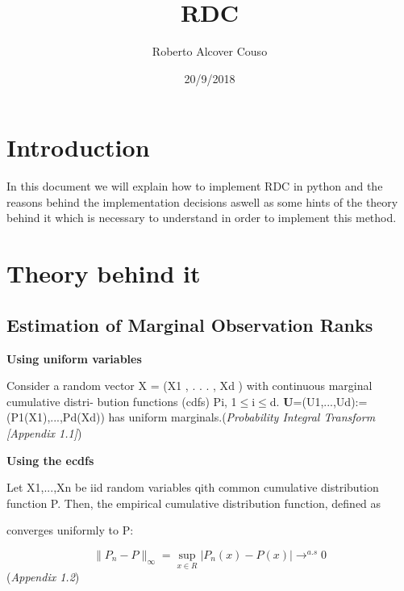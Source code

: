 \documentclass[11pt,twoside,a4paper]{article}
\begin{document}
\title{RDC}
\author{Roberto Alcover Couso}
\date{20/9/2018}
\maketitle

\section*{Introduction}
In this document we will explain how to implement RDC in python and the reasons behind the implementation decisions aswell as some hints of the theory behind it which is necessary to understand in order to implement this method.
\section*{Theory behind it}
\subsection*{Estimation of Marginal Observation Ranks}
\textbf{Using uniform variables}

Consider a random vector X = (X\small{1} , . . . , X\small{d} ) with continuous marginal cumulative distri-
bution functions (cdfs) P\small{i}, 1$\leq$i$\leq$d. 
\textbf{U}=(U\small{1},...,U\small{d}):=(P\small{1}(X\small{1}),...,P\small{d}(X\small{d})) has uniform marginals.(\textit{Probability Integral Transform [Appendix 1.1]})

\begin{flushleft}
\textbf{Using the ecdfs}

Let X\small{1},...,X\small{n} be iid random variables qith common cumulative distribution function P. Then, the empirical cumulative distribution function, defined as
\end{flushleft}
\begin{flushleft}
converges uniformly to P:
\end{flushleft}
$$\|P_{n} - P\|_{\infty}= \sup_{x \in R}|P_{n}(x) - P(x)| \rightarrow^{a.s} 0 $$
(\textit{Appendix 1.2})
\end{document}
